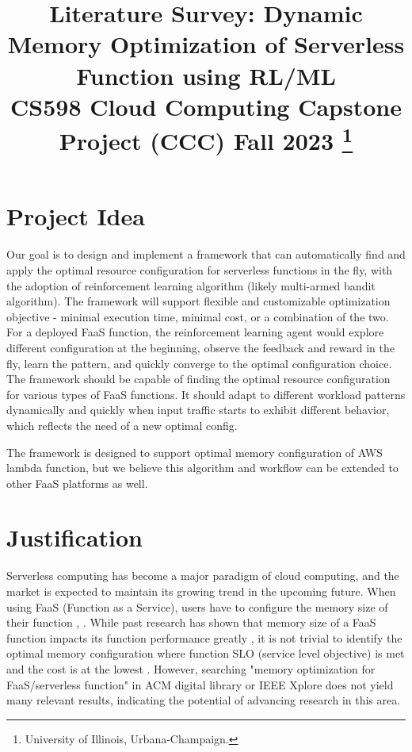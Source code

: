 \documentclass[conference]{IEEEtran}
\begin{document}
\title{Literature Survey: Dynamic Memory Optimization of Serverless Function using RL/ML\\
{\footnotesize CS598 Cloud Computing Capstone Project (CCC) Fall 2023}
\thanks{University of Illinois, Urbana-Champaign.}
}

\author{
\and
{}
\and
{}
}

\maketitle

\section{Project Idea}
Our goal is to design and implement a framework that can automatically find and apply the optimal resource configuration for serverless functions in the fly, with the adoption of reinforcement learning algorithm (likely multi-armed bandit algorithm). The framework will support flexible and customizable optimization objective - minimal execution time, minimal cost, or a combination of the two. For a deployed FaaS function, the reinforcement learning agent would explore different configuration at the beginning, observe the feedback and reward in the fly, learn the pattern, and quickly converge to the optimal configuration choice. The framework should be capable of finding the optimal resource configuration for various types of FaaS functions. It should adapt to different workload patterns dynamically and quickly when input traffic starts to exhibit different behavior, which reflects the need of a new optimal config.

The framework is designed to support optimal memory configuration of AWS lambda function, but we believe this algorithm and workflow can be extended to other FaaS platforms as well.

\section{Justification}
Serverless computing has become a major paradigm of cloud computing, and the market is expected to maintain its growing trend in the upcoming future. When using FaaS (Function as a Service), users have to configure the memory size of their function \cite{aws-lambda}, \cite{10.1145/3429880.3430094}. While past research has shown that memory size of a FaaS function impacts its function performance greatly \cite{10.1145/3464298.3493398}, it is not trivial to identify the optimal memory configuration where function SLO (service level objective) is met and the cost is at the lowest \cite{9860980}. However, searching "memory optimization for FaaS/serverless function" in ACM digital library or IEEE Xplore does not yield many relevant results, indicating the potential of advancing research in this area. 
\end{document}
